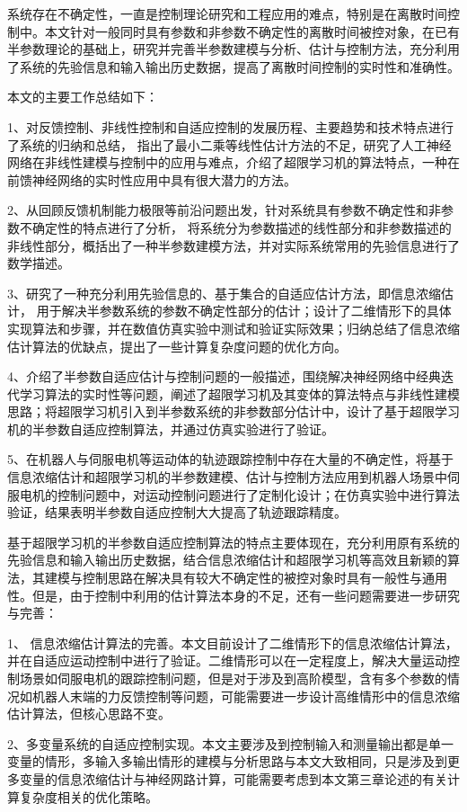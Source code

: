 
\begin{conclusion}
系统存在不确定性，一直是控制理论研究和工程应用的难点，特别是在离散时间控制中。本文针对一般同时具有参数和非参数不确定性的离散时间被控对象，在已有半参数理论的基础上，研究并完善半参数建模与分析、估计与控制方法，充分利用了系统的先验信息和输入输出历史数据，提高了离散时间控制的实时性和准确性。

本文的主要工作总结如下：

1、对反馈控制、非线性控制和自适应控制的发展历程、主要趋势和技术特点进行了系统的归纳和总结，
指出了最小二乘等线性估计方法的不足，研究了人工神经网络在非线性建模与控制中的应用与难点，介绍了超限学习机的算法特点，一种在前馈神经网络的实时性应用中具有很大潜力的方法。

2、从回顾反馈机制能力极限等前沿问题出发，针对系统具有参数不确定性和非参数不确定性的特点进行了分析，
将系统分为参数描述的线性部分和非参数描述的非线性部分，概括出了一种半参数建模方法，并对实际系统常用的先验信息进行了数学描述。

3、研究了一种充分利用先验信息的、基于集合的自适应估计方法，即信息浓缩估计，
用于解决半参数系统的参数不确定性部分的估计；设计了二维情形下的具体实现算法和步骤，并在数值仿真实验中测试和验证实际效果；归纳总结了信息浓缩估计算法的优缺点，提出了一些计算复杂度问题的优化方向。

4、介绍了半参数自适应估计与控制问题的一般描述，围绕解决神经网络中经典迭代学习算法的实时性等问题，阐述了超限学习机及其变体的算法特点与非线性建模思路；将超限学习机引入到半参数系统的非参数部分估计中，设计了基于超限学习机的半参数自适应控制算法，并通过仿真实验进行了验证。

5、在机器人与伺服电机等运动体的轨迹跟踪控制中存在大量的不确定性，将基于信息浓缩估计和超限学习机的半参数建模、估计与控制方法应用到机器人场景中伺服电机的控制问题中，对运动控制问题进行了定制化设计；在仿真实验中进行算法验证，结果表明半参数自适应控制大大提高了轨迹跟踪精度。

基于超限学习机的半参数自适应控制算法的特点主要体现在，充分利用原有系统的先验信息和输入输出历史数据，结合信息浓缩估计和超限学习机等高效且新颖的算法，其建模与控制思路在解决具有较大不确定性的被控对象时具有一般性与通用性。但是，由于控制中利用的估计算法本身的不足，还有一些问题需要进一步研究与完善：

1、 信息浓缩估计算法的完善。本文目前设计了二维情形下的信息浓缩估计算法，并在自适应运动控制中进行了验证。二维情形可以在一定程度上，解决大量运动控制场景如伺服电机的跟踪控制问题，但是对于涉及到高阶模型，含有多个参数的情况如机器人末端的力反馈控制等问题，可能需要进一步设计高维情形中的信息浓缩估计算法，但核心思路不变。

2、多变量系统的自适应控制实现。本文主要涉及到控制输入和测量输出都是单一变量的情形，多输入多输出情形的建模与分析思路与本文大致相同，只是涉及到更多变量的信息浓缩估计与神经网路计算，可能需要考虑到本文第三章论述的有关计算复杂度相关的优化策略。

\end{conclusion}